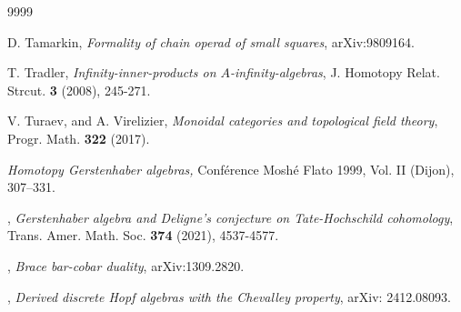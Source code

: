 \documentclass[a4paper, 11pt]{amsart}
\theoremstyle{definition}
\theoremstyle{remark}
\numberwithin{equation}{section}
\begin{document}
\begin{thebibliography}{9999}



{\sc D. Tamarkin}, {\em Formality of chain operad of small squares}, arXiv:9809164.





 {\sc T. Tradler},  {\em Infinity-inner-products on $A$-infinity-algebras}, J. Homotopy Relat. Strcut. {\bf 3} (2008), 245-271. 

 {\sc V. Turaev, and A. Virelizier}, {\em Monoidal categories and topological field theory}, Progr.
Math. {\bf 322} (2017).


 {\em Homotopy Gerstenhaber algebras,} Conf\'erence Mosh\'e Flato 1999, Vol. II (Dijon), 307--331. 


, {\em Gerstenhaber algebra and Deligne's conjecture on Tate-Hochschild cohomology}, Trans. Amer. Math. Soc. {\bf 374} (2021), 4537-4577.


 




, {\em Brace bar-cobar duality}, arXiv:1309.2820. 


, {\em Derived discrete Hopf algebras with the Chevalley property}, arXiv: 2412.08093.


\end{thebibliography}

\vskip 5pt 

\end{document}
